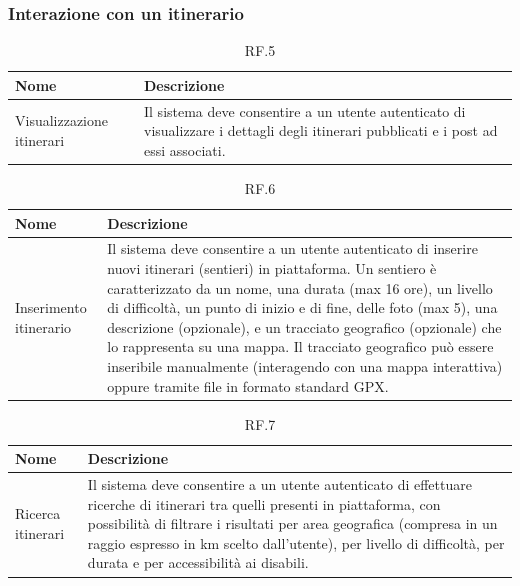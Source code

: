 \documentclass{natourDoc}
\begin{document}
\subsubsection{Interazione con un itinerario}
\begin{table}[H]
	\centering
	\begin{tabular}{ |p{5cm}|p{10.3cm}| }
		\hline
		\rowcolor{PineGreen!70}
		\textbf{Nome}             & \textbf{Descrizione}                                                 \\
		\hline
		Visualizzazione itinerari & Il sistema deve consentire a un utente autenticato di visualizzare i
		dettagli degli itinerari pubblicati e i post ad essi associati.                                  \\
		\hline
	\end{tabular}
	\caption{RF.5}

\end{table}

\begin{table}[H]
	\centering
	\begin{tabular}{ |p{5cm}|p{10.3cm}| }
		\hline
		\rowcolor{PineGreen!70}
		\textbf{Nome}          & \textbf{Descrizione}                                                                                                    \\
		\hline
		Inserimento itinerario & Il sistema deve consentire a un utente autenticato di inserire nuovi itinerari (sentieri) in piattaforma. Un sentiero è
		caratterizzato da un nome, una durata (max 16 ore), un livello di difficoltà, un punto di inizio e di fine, delle foto (max 5), una descrizione
		(opzionale), e un tracciato geografico (opzionale) che lo rappresenta su una mappa. Il tracciato
		geografico può essere inseribile manualmente (interagendo con una mappa interattiva) oppure
		tramite file in formato standard GPX.                                                                                                            \\
		\hline
	\end{tabular}
	\caption{RF.6}

\end{table}

\begin{table}[H]
	\centering
	\begin{tabular}{ |p{5cm}|p{10.3cm}| }
		\hline
		\rowcolor{PineGreen!70}
		\textbf{Nome}     & \textbf{Descrizione}                                                                                                                                               \\
		\hline
		Ricerca itinerari & Il sistema deve consentire a un utente autenticato di effettuare ricerche di itinerari tra quelli presenti in piattaforma, con possibilità di filtrare i risultati
		per area geografica (compresa in un raggio espresso in km scelto dall'utente), per livello di difficoltà, per durata e per accessibilità ai disabili.                                  \\
		\hline
	\end{tabular}
	\caption{RF.7}

\end{table}
\end{document}
